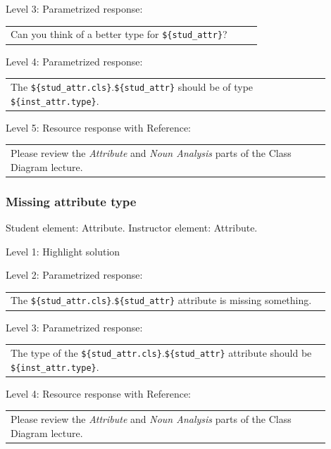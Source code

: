 \noindent Level 3: Parametrized response: \medskip

\begin{tabular}{|p{0.9\linewidth}}
Can you think of a better type for \verb|${stud_attr}|?
\end{tabular} \medskip

\noindent Level 4: Parametrized response: \medskip

\begin{tabular}{|p{0.9\linewidth}}
The \verb|${stud_attr.cls}|.\verb|${stud_attr}| should be of type \verb|${inst_attr.type}|.
\end{tabular} \medskip

\noindent Level 5: Resource response with Reference: \medskip

\begin{tabular}{|p{0.9\linewidth}}
Please review the \textit{Attribute} and \textit{Noun Analysis} parts of the Class Diagram lecture.
\end{tabular} \medskip


\subsubsection{Missing attribute type}

Student element: Attribute. Instructor element: Attribute. \medskip

\noindent Level 1: Highlight solution  \medskip

\noindent Level 2: Parametrized response: \medskip

\begin{tabular}{|p{0.9\linewidth}}
The \verb|${stud_attr.cls}|.\verb|${stud_attr}| attribute is missing something.
\end{tabular} \medskip

\noindent Level 3: Parametrized response: \medskip

\begin{tabular}{|p{0.9\linewidth}}
The type of the \verb|${stud_attr.cls}|.\verb|${stud_attr}| attribute should be \verb|${inst_attr.type}|.
\end{tabular} \medskip

\noindent Level 4: Resource response with Reference: \medskip

\begin{tabular}{|p{0.9\linewidth}}
Please review the \textit{Attribute} and \textit{Noun Analysis} parts of the Class Diagram lecture.
\end{tabular} \medskip


